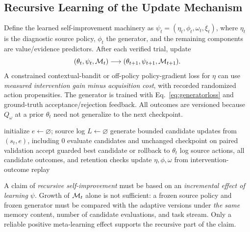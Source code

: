\subsection{Recursive Learning of the Update Mechanism}
\label{sec:recursive}
Define the learned self-improvement machinery as
$\psi_t=(\eta_t,\phi_t,\omega_t,\xi_t)$, where $\eta_t$
is the diagnostic source policy, $\phi_t$ the generator, and the
remaining components are value/evidence predictors.
After each verified trial, update
\begin{equation}
(\theta_t,\psi_t,\mathcal{M}_t)
\longrightarrow
(\theta_{t+1},\psi_{t+1},\mathcal{M}_{t+1}).
\label{eq:recursion}
\end{equation}
A constrained contextual-bandit or off-policy policy-gradient
loss for $\eta$ can use \emph{measured intervention gain minus
acquisition cost}, with recorded randomized action propensities.
The generator is trained with Eq.~\eqref{eq:generatorloss} and
ground-truth acceptance/rejection feedback. All outcomes are
versioned because $Q_\omega$ at a prior $\theta_t$ need not
generalize to the next checkpoint.

\begin{algorithm}[t]
\caption{Proposed SPEAR improvement round (research protocol)}
\label{alg:spear}
\DontPrintSemicolon
{}
initialize $e\leftarrow\varnothing$; source log $L\leftarrow\varnothing$\;
generate bounded candidate updates from $(s_t,e)$, including $0$\;
evaluate candidates and unchanged checkpoint on paired validation\;
accept guarded best candidate or rollback to $\theta_t$\;
log source actions, all candidate outcomes, and retention checks\;
update $\eta,\phi,\omega$ from intervention-outcome replay\;
\end{algorithm}

A claim of \emph{recursive self-improvement} must be based on an
\emph{incremental effect of learning $\psi$}. Growth of $\mathcal{M}_t$ alone
is not sufficient: a frozen source policy and frozen generator
must be compared with the adaptive versions under \emph{the same}
memory content, number of candidate evaluations, and task stream.
Only a reliable positive meta-learning effect supports the
recursive part of the claim.

